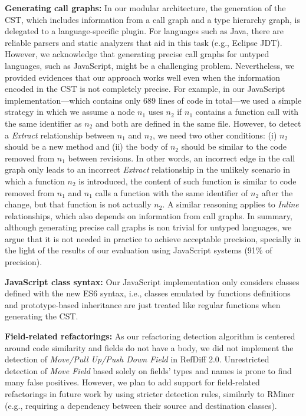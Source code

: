 \noindent\textbf{Generating call graphs:} In our modular architecture, the generation of the CST, which includes information from a call graph and a type hierarchy graph, is delegated to a language-specific plugin.
For languages such as Java, there are reliable parsers and static analyzers that aid in this task (e.g., Eclipse JDT).
However, we acknowledge that generating precise call graphs for untyped languages, such as JavaScript, might be a challenging problem.
Nevertheless, we provided evidences that our approach works well even when the information encoded in the CST is not completely precise.
For example, in our JavaScript implementation---which contains only 689 lines of code in total---we used a simple strategy in which we assume a node $n_1$ uses $n_2$ if $n_1$ contains a function call with the same identifier as $n_2$ and both are defined in the same file.
However, to detect a \emph{Extract} relationship between $n_1$ and $n_2$, we need two other conditions: (i) $n_2$ should be a new method and (ii) the body of $n_2$ should be similar to the code removed from $n_1$ between revisions.
In other words, an incorrect edge in the call graph only leads to an incorrect \emph{Extract} relationship in the unlikely scenario in which a function $n_2$ is introduced, the content of such function is similar to code removed from $n_1$ and $n_1$ calls a function with the same identifier of $n_2$ after the change, but that function is not actually $n_2$.
A similar reasoning applies to \emph{Inline} relationships, which also depends on information from call graphs.
In summary, although generating precise call graphs is non trivial for untyped languages, we argue that it is not needed in practice to achieve acceptable  precision, specially in the light of the results of our evaluation using JavaScript systems (91\% of precision).

\noindent\textbf{JavaScript class syntax:} Our JavaScript implementation only considers classes defined with the new ES6 syntax, i.e., classes emulated by  functions definitions and prototype-based inheritance are just treated like regular functions when generating the CST.

\noindent\textbf{Field-related refactorings:}
As our refactoring detection algorithm is centered around code similarity and fields do not have a body, we did not implement the detection of \emph{Move/Pull Up/Push Down Field} in RefDiff 2.0.
Unrestricted detection of \emph{Move Field} based solely on fields' types and names is prone to find many false positives.
However, we plan to add support for field-related refactorings in future work by using stricter detection rules, similarly to RMiner (e.g., requiring a dependency between their source and destination classes).

